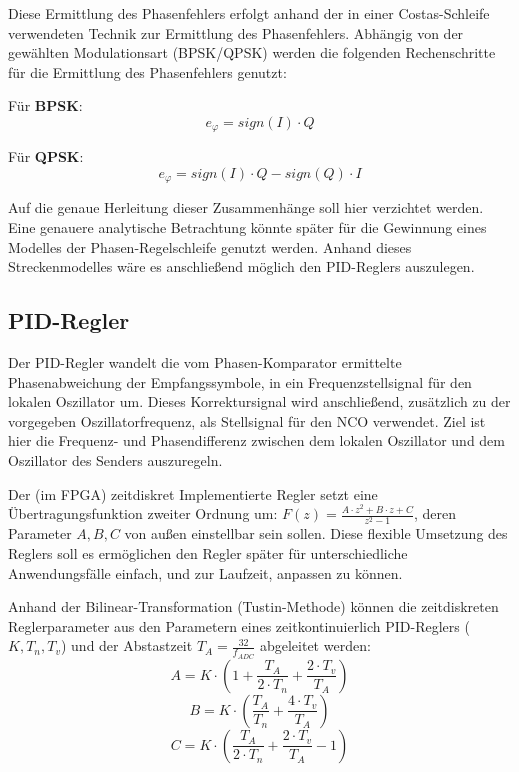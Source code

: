 Diese Ermittlung des Phasenfehlers erfolgt anhand der in einer Costas-Schleife verwendeten Technik zur Ermittlung des Phasenfehlers.\cite{WPI_COSTAS}
Abhängig von der gewählten Modulationsart (\acs{BPSK}/\acs{QPSK}) werden die folgenden Rechenschritte für die Ermittlung des Phasenfehlers genutzt:

Für \textbf{\acs{BPSK}}:
\begin{equation}
	e_\varphi = sign(I)\cdot Q
\end{equation}

Für \textbf{\acs{QPSK}}:
\begin{equation}
	e_\varphi = sign(I)\cdot Q - sign(Q)\cdot I
\end{equation}

Auf die genaue Herleitung dieser Zusammenhänge soll hier verzichtet werden. Eine genauere analytische Betrachtung \cite{IEEE_ART_COSTAS} könnte später für die Gewinnung eines 
Modelles der Phasen-Regelschleife genutzt werden. Anhand dieses Streckenmodelles wäre es anschließend möglich den \acs{PID}-Reglers auszulegen.
		
\subsection{\acs{PID}-Regler} \label{Sec:PID}
	
Der \acs{PID}-Regler wandelt die vom Phasen-Komparator ermittelte Phasenabweichung der Empfangssymbole, in ein Frequenzstellsignal für den lokalen Oszillator um. 
Dieses Korrektursignal wird anschließend, zusätzlich zu der vorgegeben Oszillatorfrequenz, als Stellsignal für den \acs{NCO} verwendet.
Ziel ist hier die Frequenz- und Phasendifferenz zwischen dem lokalen Oszillator und dem Oszillator des Senders auszuregeln.
	
Der (im \acs{FPGA}) zeitdiskret Implementierte Regler setzt eine Übertragungsfunktion zweiter Ordnung um: $F(z)=\frac{A\cdot z^2 + B\cdot z + C}{z^2 - 1}$, deren Parameter $A,B,C$
von außen einstellbar sein sollen. 
Diese flexible Umsetzung des Reglers soll es ermöglichen den Regler später für unterschiedliche Anwendungsfälle einfach, und zur Laufzeit, anpassen zu können.

Anhand der Bilinear-Transformation (Tustin-Methode) können die zeitdiskreten Reglerparameter aus den Parametern eines zeitkontinuierlich \acs{PID}-Reglers ($K,T_n,T_v$) und der Abstastzeit
$T_A = \frac{32}{f_{ADC}}$ abgeleitet werden:
\begin{equation}
	A = K\cdot (1 + \frac{T_A}{2\cdot T_n} + \frac{2\cdot T_v}{T_A})
\end{equation}
\begin{equation}
	B = K\cdot (\frac{T_A}{T_n} + \frac{4\cdot T_v}{T_A})
\end{equation}
\begin{equation}
	C = K\cdot (\frac{T_A}{2\cdot T_n} + \frac{2\cdot T_v}{T_A} - 1)
\end{equation}

